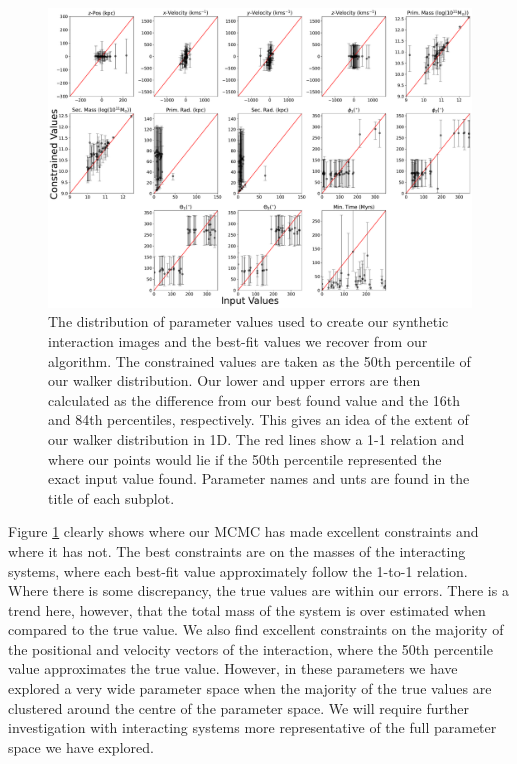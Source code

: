 \begin{figure}
    \centering
    \includegraphics[width=\textwidth]{Chapter1/figures/39_51.pdf}
    \caption[The distribution of parameter values used to create our synthetic interaction images and the best-fit values we recover from our algorithm.]{The distribution of parameter values used to create our synthetic interaction images and the best-fit values we recover from our algorithm. The constrained values are taken as the 50th percentile of our walker distribution. Our lower and upper errors are then calculated as the difference from our best found value and the 16th and 84th percentiles, respectively. This gives an idea of the extent of our walker distribution in 1D. The red lines show a 1-1 relation and where our points would lie if the 50th percentile represented the exact input value found. Parameter names and unts are found in the title of each subplot.}
    \label{fig:true-found-parameters}
\end{figure}

Figure \ref{fig:true-found-parameters} clearly shows where our MCMC has made excellent constraints and where it has not. The best constraints are on the masses of the interacting systems, where each best-fit value approximately follow the 1-to-1 relation. Where there is some discrepancy, the true values are within our errors. There is a trend here, however, that the total mass of the system is over estimated when compared to the true value. We also find excellent constraints on the majority of the positional and velocity vectors of the interaction, where the 50th percentile value approximates the true value. However, in these parameters we have explored a very wide parameter space when the majority of the true values are clustered around the centre of the parameter space. We will require further investigation with interacting systems more representative of the full parameter space we have explored. 


